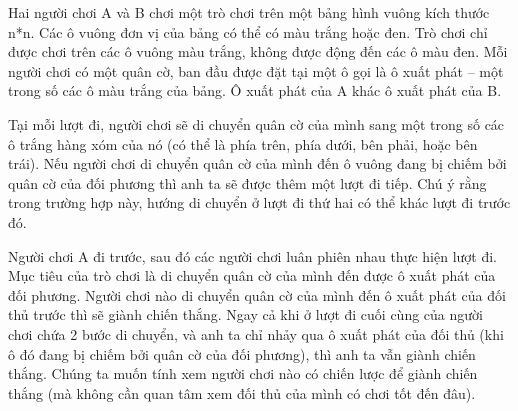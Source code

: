 Hai người chơi A và B chơi một trò chơi trên một bảng hình vuông kích thước n*n. Các ô vuông đơn vị của bảng có thể có màu trắng hoặc đen. Trò chơi chỉ được chơi trên các ô vuông màu trắng, không được động đến các ô màu đen. Mỗi người chơi có một quân cờ, ban đầu được đặt tại một ô gọi là ô xuất phát – một trong số các ô màu trắng của bảng. Ô xuất phát của A khác ô xuất phát của B.  

   Tại mỗi lượt đi, người chơi sẽ di chuyển quân cờ của mình sang một trong số các ô trắng hàng xóm của nó (có thể là phía trên, phía dưới, bên phải, hoặc bên trái). Nếu người chơi di chuyển quân cờ của mình đến ô vuông đang bị chiếm bởi quân cờ của đối phương thì anh ta sẽ được thêm một lượt đi tiếp. Chú ý rằng trong trường hợp này, hướng di chuyển ở lượt đi thứ hai có thể khác lượt đi trước đó.  

   Người chơi A đi trước, sau đó các người chơi luân phiên nhau thực hiện lượt đi. Mục tiêu của trò chơi là di chuyển quân cờ của mình đến được ô xuất phát của đối phương. Người chơi nào di chuyển quân cờ của mình đến ô xuất phát của đối thủ trước thì sẽ giành chiến thắng. Ngay cả khi ở lượt đi cuối cùng của người chơi chứa 2 bước di chuyển, và anh ta chỉ nhảy qua ô xuất phát của đối thủ (khi ô đó đang bị chiếm bởi quân cờ của đối phương), thì anh ta vẫn giành chiến thắng. Chúng ta muốn tính xem người chơi nào có chiến lược để giành chiến thắng (mà không cần quan tâm xem đối thủ của mình có chơi tốt đến đâu).